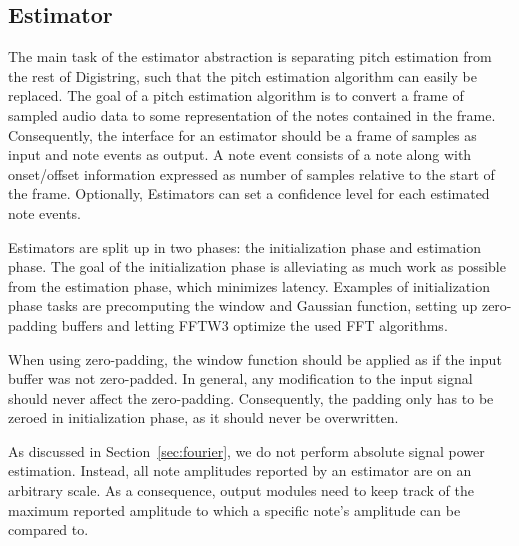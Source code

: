 \documentclass[a4paper,10pt,twocolumn]{article}
\begin{document}
\subsection{Estimator}
%
The main task of the estimator abstraction is separating pitch estimation from the rest of Digistring, such that the pitch estimation algorithm can easily be replaced. The goal of a pitch estimation algorithm is to convert a frame of sampled audio data to some representation of the notes contained in the frame. Consequently, the interface for an estimator should be a frame of samples as input and note events as output. A note event consists of a note along with onset/offset information expressed as number of samples relative to the start of the frame. Optionally, Estimators can set a confidence level for each estimated note events.

Estimators are split up in two phases: the initialization phase and estimation phase. The goal of the initialization phase is alleviating as much work as possible from the estimation phase, which minimizes latency. Examples of initialization phase tasks are precomputing the window and Gaussian function, setting up zero-padding buffers and letting FFTW3 optimize the used FFT algorithms.

When using zero-padding, the window function should be applied as if the input buffer was not zero-padded. In general, any modification to the input signal should never affect the zero-padding. Consequently, the padding only has to be zeroed in initialization phase, as it should never be overwritten.

As discussed in Section~\ref{sec:fourier}, we do not perform absolute signal power estimation. Instead, all note amplitudes reported by an estimator are on an arbitrary scale. As a consequence, output modules need to keep track of the maximum reported amplitude to which a specific note's amplitude can be compared to.

\end{document}
